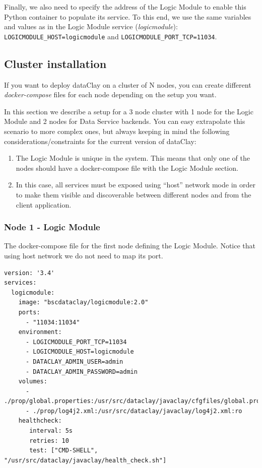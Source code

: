 Finally, we also need to specify the address of the Logic Module to enable this Python container to populate its service. To this end, we use the same variables and values as in the Logic Module service (\textit{logicmodule}): \texttt{LOGICMODULE\_HOST=logicmodule} and \texttt{LOGICMODULE\_PORT\_TCP=11034}.

\subsection{Cluster installation}

If you want to deploy dataClay on a cluster of N nodes, you can create different \textit{docker-compose} files for each node depending on the setup you want.

In this section we describe a setup for a 3 node cluster with 1 node for the Logic Module and 2 nodes for Data Service backends. You can easy extrapolate this scenario to more complex ones, but always keeping in mind the following considerations/constraints for the current version of dataClay:

\begin{enumerate}
 \item The Logic Module is unique in the system. This means that only one of the nodes should have a docker-compose file with the Logic Module section.
 \item In this case, all services must be exposed using ``host'' network mode in order to make them visible and discoverable between different nodes and from the client application.
\end{enumerate}

\subsubsection{Node 1 - Logic Module}

The docker-compose file for the first node defining the Logic Module. Notice that using host network we do not need to map its port.

\begin{tBox}
 \begin{lstlisting}[language=docker-compose-2, frame=none]
version: '3.4'
services:
  logicmodule:
    image: "bscdataclay/logicmodule:2.0"
    ports:
      - "11034:11034"
    environment:
      - LOGICMODULE_PORT_TCP=11034
      - LOGICMODULE_HOST=logicmodule
      - DATACLAY_ADMIN_USER=admin
      - DATACLAY_ADMIN_PASSWORD=admin
    volumes:
      - ./prop/global.properties:/usr/src/dataclay/javaclay/cfgfiles/global.properties:ro
      - ./prop/log4j2.xml:/usr/src/dataclay/javaclay/log4j2.xml:ro
    healthcheck:
       interval: 5s
       retries: 10
       test: ["CMD-SHELL", "/usr/src/dataclay/javaclay/health_check.sh"]
 \end{lstlisting}
\end{tBox}

